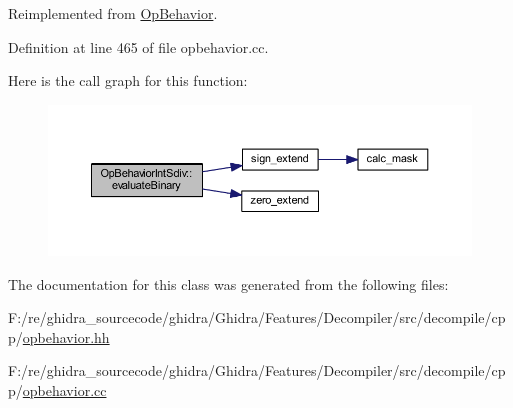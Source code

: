 Reimplemented from \mbox{\hyperlink{class_op_behavior_aeeed3af7aa35264b31a1f182884214a9}{Op\+Behavior}}.



Definition at line 465 of file opbehavior.\+cc.

Here is the call graph for this function\+:
\nopagebreak
\begin{figure}[H]
\begin{center}
\leavevmode
\includegraphics[width=350pt]{class_op_behavior_int_sdiv_a8e16d2dd1c72b90b6e2b0d85544d5d11_cgraph}
\end{center}
\end{figure}


The documentation for this class was generated from the following files\+:\begin{DoxyCompactItemize}
\item 
F\+:/re/ghidra\+\_\+sourcecode/ghidra/\+Ghidra/\+Features/\+Decompiler/src/decompile/cpp/\mbox{\hyperlink{opbehavior_8hh}{opbehavior.\+hh}}\item 
F\+:/re/ghidra\+\_\+sourcecode/ghidra/\+Ghidra/\+Features/\+Decompiler/src/decompile/cpp/\mbox{\hyperlink{opbehavior_8cc}{opbehavior.\+cc}}\end{DoxyCompactItemize}
